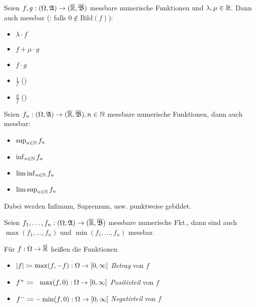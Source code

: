 \documentclass{cheat-sheet}
\newcommand{\Alg}{\mathfrak{A}} %
\newcommand{\Bor}{\mathfrak{B}} %
\theoremstyle{definition}
\begin{document}
\begin{satz}
  Seien $f, g : (\Omega, \Alg) \to (\ER, \overline{\Bor})$ messbare numerische Funktionen und $\lambda, \mu \in \mathbb{R}$. Dann auch messbar (\ddag: falls $0 \not\in \mathrm{Bild}(f)$):
  \begin{multicols}{5}
    \begin{itemize}
      \item $\lambda \cdot f$
      \item $f + \mu \cdot g$
      \item $f \cdot g$
      \item $\tfrac{1}{f}$ (\ddag)
      \item $\tfrac{g}{f}$ (\ddag)
    \end{itemize}
  \end{multicols}
\end{satz}

\begin{satz}
  Seien $f_n : (\Omega, \Alg) \to (\ER, \overline{\Bor}), n \in \N$ messbare numerische Funktionen, dann auch messbar:
  \begin{multicols}{4}
    \begin{itemize}
      \item $\sup_{n \in \mathbb{N}} f_n$
      \item $\inf_{n \in \mathbb{N}} f_n$
      \item $\liminf_{n \in \mathbb{N}} f_n$
      \item $\limsup_{n \in \mathbb{N}} f_n$
    \end{itemize}
  \end{multicols}
  \vspace{4pt}
  Dabei werden Infimum, Supremum, usw. punktweise gebildet.
\end{satz}

\begin{satz}
  Seien $f_1, \ldots, f_n : (\Omega, \Alg) \to (\ER, \overline{\Bor})$ messbare numerische Fkt., dann sind auch $\max(f_1, \ldots, f_n)$ und $\min(f_1, \ldots, f_n)$ messbar.
\end{satz}

\begin{defn}
  Für $f : \Omega \to \overline{\mathbb{R}}$ heißen die Funktionen
  \begin{itemize}
    \item $\lvert f\rvert \coloneqq \max(f, -f) : \Omega \to \left[ 0, \infty \right]$ \emph{Betrag} von $f$
    \item $f^+ \coloneqq \,\,\,\, \max(f, 0) : \Omega \to \left[ 0, \infty \right]$ \emph{Positivteil} von $f$
    \item $f^- \coloneqq -\min(f, 0) : \Omega \to \left[ 0, \infty \right]$ \emph{Negativteil} von $f$
  \end{itemize}
\end{defn}
\end{document}
